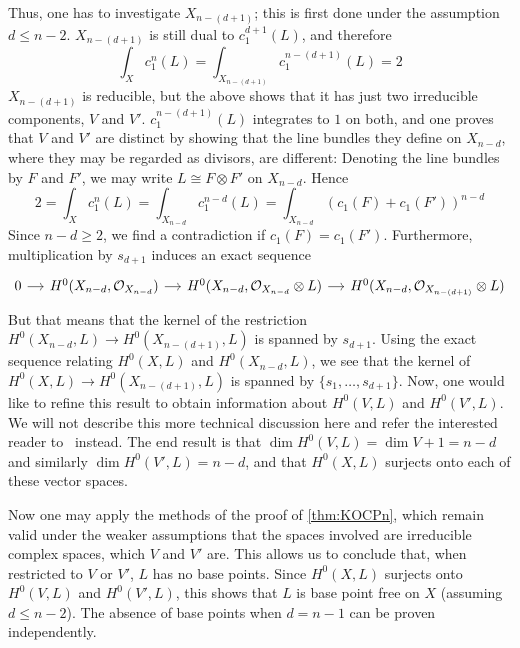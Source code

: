 \begin{myproof}
	Thus, one has to investigate $X_{n-(d+1)}$; this is first done under the assumption $d\leq n-2$. $X_{n-(d+1)}$ is still dual to $c_1^{d+1}(L)$, and therefore
	\begin{equation*}
		\int_X c_1^n(L)=\int_{X_{n-(d+1)}} c_1^{n-(d+1)}(L)=2
	\end{equation*}
	$X_{n-(d+1)}$ is reducible, but the above shows that it has just two irreducible components, $V$ and $V'$. $c_1^{n-(d+1)}(L)$ integrates to $1$ on both, and one proves that $V$ and $V'$ are distinct by showing that the line bundles they define on $X_{n-d}$, where they may be regarded as divisors, are different: Denoting the line bundles by $F$ and $F'$, we may write $L\cong F\otimes F'$ on $X_{n-d}$. Hence 
	\begin{equation*}
		2=\int_X c_1^n(L)=\int_{X_{n-d}}c_1^{n-d}(L)=\int_{X_{n-d}} (c_1(F)+c_1(F'))^{n-d}
	\end{equation*}
	Since $n-d\geq 2$, we find a contradiction if $c_1(F)=c_1(F')$. Furthermore, multiplication by $s_{d+1}$ induces an exact sequence 
	\begin{equation*}
		\begin{tikzcd}[column sep=small]
			0 \ar[r] & H^0(X_{n-d},\mc O_{X_{n-d}}) \ar[r] & H^0(X_{n-d},\mc O_{X_{n-d}}\otimes L) \ar[r] 
			& H^0(X_{n-d},\mc O_{X_{n-(d+1)}}\otimes L)
		\end{tikzcd}
	\end{equation*}
	But that means that the kernel of the restriction $H^0(X_{n-d},L)\to H^0(X_{n-(d+1)},L)$ is spanned by $s_{d+1}$. Using the exact sequence relating $H^0(X,L)$ and $H^0(X_{n-d},L)$, we see that the kernel of $H^0(X,L)\to H^0(X_{n-(d+1)},L)$ is spanned by $\{s_1,\dots,s_{d+1}\}$. Now, one would like to refine this result to obtain information about $H^0(V,L)$ and $H^0(V',L)$. We will not describe this more technical discussion here and refer the interested reader to~\cite{KO1973} instead. The end result is that $\dim H^0(V,L)=\dim V+1=n-d$ and similarly $\dim H^0(V',L)=n-d$, and that $H^0(X,L)$ surjects onto each of these vector spaces. 
	
	Now one may apply the methods of the proof of \cref{thm:KOCPn}, which remain valid under the weaker assumptions that the spaces involved are irreducible complex spaces, which $V$ and $V'$ are. This allows us to conclude that, when restricted to $V$ or $V'$, $L$ has no base points. Since $H^0(X,L)$ surjects onto $H^0(V,L)$ and $H^0(V',L)$, this shows that $L$ is base point free on $X$ (assuming $d\leq n-2$). The absence of base points when $d=n-1$ can be proven independently. 
	

\end{myproof}
